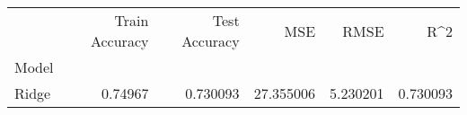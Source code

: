 \begin{tabular}{lrrrrr}
\toprule
{} &  Train Accuracy &  Test Accuracy &        MSE &      RMSE &       R\textasciicircum 2 \\
Model &                 &                &            &           &           \\
\midrule
Ridge &         0.74967 &       0.730093 &  27.355006 &  5.230201 &  0.730093 \\
\bottomrule
\end{tabular}
